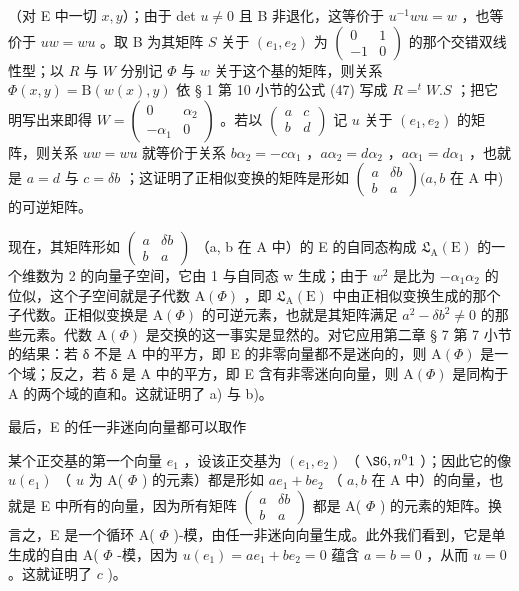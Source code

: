 （对 E 中一切 \(x, y\)）；由于 det \(u \neq 0\) 且 B 非退化，这等价于 \(u^{-1}wu = w\) ，也等价于 \(uw = wu\) 。取 B 为其矩阵 \(S\) 关于 \((e_1, e_2)\) 为 \(\begin{pmatrix} 0 & 1 \\ -1 & 0 \end{pmatrix}\) 的那个交错双线性型；以 \(R\) 与 \(W\) 分别记 \(\Phi\) 与 \(w\) 关于这个基的矩阵，则关系 \(\Phi(x, y) = \mathrm{B}(w(x), y)\) 依 § 1 第 10 小节的公式 (47) 写成 \(R = ^t W.S\) ；把它明写出来即得 \(W = \begin{pmatrix} 0 & \alpha_2 \\ -\alpha_1 & 0 \end{pmatrix}\) 。若以 \(\begin{pmatrix} a & c \\ b & d \end{pmatrix}\) 记 \(u\) 关于 \((e_1, e_2)\) 的矩阵，则关系 \(uw = wu\) 就等价于关系 \(b\alpha_2 = -c\alpha_1\) ，\(a\alpha_2 = d\alpha_2\) ，\(a\alpha_1 = d\alpha_1\) ，也就是 \(a = d\) 与 \(c = \delta b\) ；这证明了正相似变换的矩阵是形如 \(\begin{pmatrix} a & \delta b \\ b & a \end{pmatrix}(a, b\) 在 A 中)的可逆矩阵。

现在，其矩阵形如 \(\begin{pmatrix} a & \delta b \\ b & a \end{pmatrix}\) （a, b 在 A 中）的 E 的自同态构成 \(\mathfrak{L}_{\mathrm{A}}(\mathrm{E})\) 的一个维数为 2 的向量子空间，它由 1 与自同态 w 生成；由于 \(w^{2}\) 是比为 \(-\alpha_{1}\alpha_{2}\) 的位似，这个子空间就是子代数 \(\mathrm{A}(\Phi)\) ，即 \(\mathfrak{L}_{\mathrm{A}}(\mathrm{E})\) 中由正相似变换生成的那个子代数。正相似变换是 \(\mathrm{A}(\Phi)\) 的可逆元素，也就是其矩阵满足 \(a^{2}-\delta b^{2}\neq0\) 的那些元素。代数 \(\mathrm{A}(\Phi)\) 是交换的这一事实是显然的。对它应用第二章 § 7 第 7 小节的结果：若 δ 不是 A 中的平方，即 E 的非零向量都不是迷向的，则 \(\mathrm{A}(\Phi)\) 是一个域；反之，若 δ 是 A 中的平方，即 E 含有非零迷向向量，则 \(\mathrm{A}(\Phi)\) 是同构于 A 的两个域的直和。这就证明了 a) 与 b)。

最后，E 的任一非迷向向量都可以取作

某个正交基的第一个向量 \(e_1\) ，设该正交基为 \((e_1, e_2)\) （ \(\S 6, n^0 1\) ）；因此它的像 \(u(e_1)\) （ \(u\) 为 A( \(\Phi\) ) 的元素）都是形如 \(ae_1 + be_2\) （ \(a, b\) 在 A 中）的向量，也就是 E 中所有的向量，因为所有矩阵 \(\begin{pmatrix} a & \delta b \\ b & a \end{pmatrix}\) 都是 A( \(\Phi\) ) 的元素的矩阵。换言之，E 是一个循环 A( \(\Phi\) )-模，由任一非迷向向量生成。此外我们看到，它是单生成的自由 A( \(\Phi\) -模，因为 \(u(e_1) = ae_1 + be_2 = 0\) 蕴含 \(a = b = 0\) ，从而 \(u = 0\) 。这就证明了 \(c\) )。

